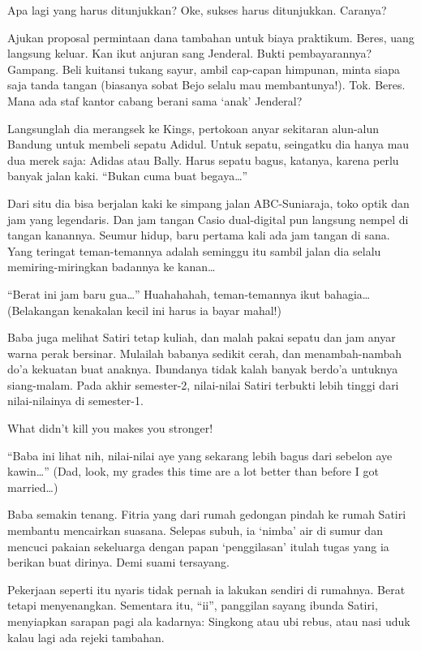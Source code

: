 Apa lagi yang harus ditunjukkan? Oke, sukses harus ditunjukkan. Caranya?

Ajukan proposal permintaan dana tambahan untuk biaya praktikum. Beres, uang langsung keluar. Kan ikut anjuran sang Jenderal. Bukti pembayarannya? Gampang. Beli kuitansi tukang sayur, ambil cap-capan himpunan, minta siapa saja tanda tangan (biasanya sobat Bejo selalu mau membantunya!). Tok. Beres. Mana ada staf kantor cabang berani sama ‘anak’ Jenderal?

Langsunglah dia merangsek ke Kings, pertokoan anyar sekitaran alun-alun Bandung untuk membeli sepatu Adidul. Untuk sepatu, seingatku dia hanya mau dua merek saja: Adidas atau Bally. Harus sepatu bagus, katanya, karena perlu banyak jalan kaki. “Bukan cuma buat begaya…”

Dari situ dia bisa berjalan kaki ke simpang jalan ABC-Suniaraja, toko optik dan jam yang legendaris. Dan jam tangan Casio dual-digital pun langsung nempel di tangan kanannya. Seumur hidup, baru pertama kali ada jam tangan di sana. Yang teringat teman-temannya adalah seminggu itu sambil jalan dia selalu memiring-miringkan badannya ke kanan…

“Berat ini jam baru gua…” Huahahahah, teman-temannya ikut bahagia… (Belakangan kenakalan kecil ini harus ia bayar mahal!)

Baba juga melihat Satiri tetap kuliah, dan malah pakai sepatu dan jam anyar warna perak bersinar. Mulailah babanya sedikit cerah, dan menambah-nambah do’a kekuatan buat anaknya. Ibundanya tidak kalah banyak berdo’a untuknya siang-malam. Pada akhir semester-2, nilai-nilai Satiri terbukti lebih tinggi dari nilai-nilainya di semester-1.

What didn’t kill you makes you stronger!

“Baba ini lihat nih, nilai-nilai aye yang sekarang lebih bagus dari sebelon aye kawin…” (Dad, look, my grades this time are a lot better than before I got married…)

Baba semakin tenang. Fitria yang dari rumah gedongan pindah ke rumah Satiri membantu mencairkan suasana. Selepas subuh, ia ‘nimba’ air di sumur dan mencuci pakaian sekeluarga dengan papan ‘penggilasan’ itulah tugas yang ia berikan buat dirinya. Demi suami tersayang.

Pekerjaan seperti itu nyaris tidak pernah ia lakukan sendiri di rumahnya. Berat tetapi menyenangkan. Sementara itu, “ii”, panggilan sayang ibunda Satiri, menyiapkan sarapan pagi ala kadarnya: Singkong atau ubi rebus, atau nasi uduk kalau lagi ada rejeki tambahan.

